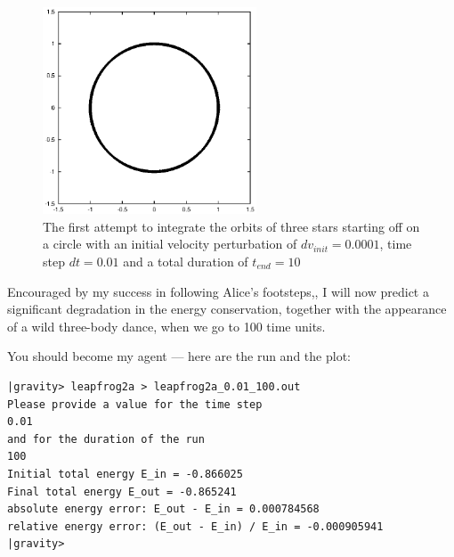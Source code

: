 \begin{figure}[htb]
\centering
\includegraphics[width=2.5in]{chap5/leapfrog2a_0.01_10.ps}
\caption[Three stars on a circle, leapfrog, $dv_{init}=0.0001$, $dt = 0.01$,
$t_{end} = 10$]
{The first attempt to integrate the orbits of three stars
starting off on a circle with an initial velocity perturbation of 
$dv_{init}=0.0001$, time step $dt = 0.01$ and a total duration of
$t_{end} = 10$}
\label{fig:leap2a-0.01-10}
\end{figure}

\abc

\bob
Encouraged by my success in following Alice's footsteps,, I will now
predict a significant degradation in the energy conservation, together
with the appearance of a wild three-body dance, when we go to 100 time
units.

\alice
You should become my agent --- here are the run and the plot:

\cba

\begin{small}
\begin{verbatim}
|gravity> leapfrog2a > leapfrog2a_0.01_100.out
Please provide a value for the time step
0.01
and for the duration of the run
100
Initial total energy E_in = -0.866025
Final total energy E_out = -0.865241
absolute energy error: E_out - E_in = 0.000784568
relative energy error: (E_out - E_in) / E_in = -0.000905941
|gravity>
\end{verbatim}
\end{small}

